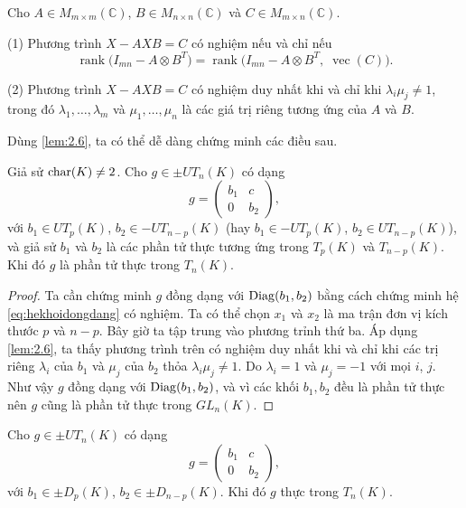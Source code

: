\begin{lem}\label{lem:2.6}
Cho \(A\in M_{m\times m}(\mathbb{C})\), \(B\in M_{n\times n}(\mathbb{C})\) và
\(C\in M_{m\times n}(\mathbb{C})\).

(1) Phương trình 
\(X - A X B = C\)
có nghiệm nếu và chỉ nếu
\[
\operatorname{rank}\bigl(I_{mn} - A \otimes B^{T}\bigr)
=
\operatorname{rank}\bigl(I_{mn} - A \otimes B^{T},\; \operatorname{vec}(C)\bigr).
\]

(2) Phương trình
\(
X - A X B = C
\)
có nghiệm duy nhất khi và chỉ khi \(\lambda_i\mu_j \neq 1\), trong đó \(\lambda_1,\dots,\lambda_m\) và
\(\mu_1,\dots,\mu_n\) là các giá trị riêng tương ứng của \(A\) và \(B\).
\end{lem}

Dùng \cref{lem:2.6}, ta có thể dễ dàng chứng minh các điều sau.

\begin{prop}\label{prop:2.7}
Giả sử \(\operatorname{char}(K)\neq 2\). Cho \( g\in\pm UT_n(K) \) có dạng
\[
g=\begin{pmatrix} b_1 & c \\[4pt] 0 & b_2 \end{pmatrix},
\]
với \(b_1\in UT_p(K)\), \(b_2\in -UT_{n-p}(K)\) (hay \(b_1\in -UT_p(K)\),
\(b_2\in UT_{n-p}(K)\)), và giả sử \(b_1\) và \(b_2\) là các phần tử thực tương ứng trong
\(T_p(K)\) và \(T_{n-p}(K)\). Khi đó \(g\) là phần tử thực trong \(T_n(K)\).
\end{prop}

\begin{proof}
Ta cần chứng minh \(g\) đồng dạng với \(\operatorname{Diag}(b_1,b_2)\) bằng cách chứng minh hệ \cref{eq:hekhoidongdang} có nghiệm. Ta có thể chọn \(x_1\) và \(x_2\) là ma trận
đơn vị kích thước \(p\) và \(n-p\). Bây giờ ta tập trung vào phương trỉnh thứ ba. Áp dụng \cref{lem:2.6}, ta thấy phương trình trên có nghiệm duy nhất khi và chỉ khi các trị riêng \(\lambda_i\) của \(b_1\)
và \(\mu_j\) của \(b_2\) thỏa \(\lambda_i\mu_j\neq1\). Do $\lambda_i=1$ và $\mu_j=-1$ với mọi \(i\), \(j\). Như vậy \(g\) đồng dạng với \(\operatorname{Diag}(b_1,b_2)\), và vì các khối \(b_1,b_2\) đều là phần tử thực nên \(g\) cũng
là phần tử thực trong \(GL_n(K)\).

\end{proof}

\begin{prop}\label{prop:2.8}
Cho \(g\in\pm UT_n(K)\) có dạng 
\[g=\begin{pmatrix} b_1 & c \\[4pt] 0 & b_2 \end{pmatrix},\]
với \(b_1\in \pm D_p(K)\), \(b_2\in \pm D_{n-p}(K)\). Khi đó \(g\) thực trong \(T_n(K)\).
\end{prop}

